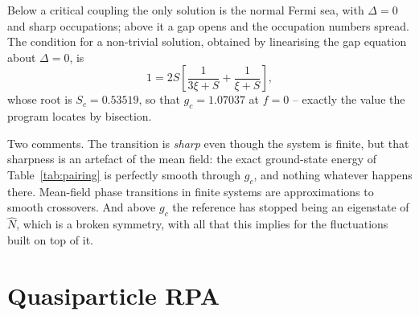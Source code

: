 Below a critical coupling the only solution is the normal Fermi sea, with
$\Delta=0$ and sharp occupations; above it a gap opens and the occupation
numbers spread.  The condition for a non-trivial solution, obtained by
linearising the gap equation about $\Delta=0$, is
\begin{equation}
  1 = 2S\left[\frac{1}{3\xi+S}+\frac{1}{\xi+S}\right],
  \label{eq:7-gc}
\end{equation}
whose root is $S_c=0.53519$, so that $g_c=1.07037$ at $f=0$ -- exactly the
value the program locates by bisection.

Two comments.  The transition is \emph{sharp} even though the system is
finite, but that sharpness is an artefact of the mean field: the exact
ground-state energy of Table~\ref{tab:pairing} is perfectly smooth through
$g_c$, and nothing whatever happens there.  Mean-field phase transitions in
finite systems are approximations to smooth crossovers.  And above $g_c$ the
reference has stopped being an eigenstate of $\hat{N}$, which is a broken
symmetry, with all that this implies for the fluctuations built on top of it.

\section{Quasiparticle RPA}
\label{sec:qrpa}

